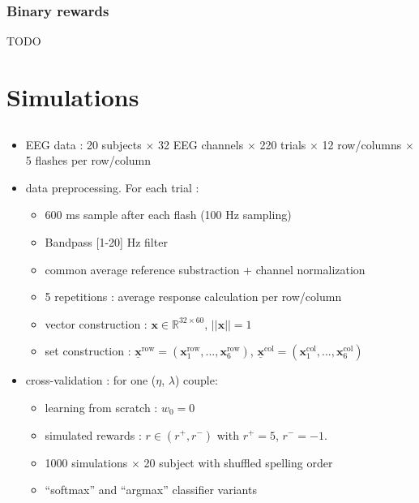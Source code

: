 \documentclass{beamer}
\begin{document}
\begin{frame}\frametitle{Binary rewards}
TODO
\end{frame}

\section{Simulations}
\subsection*{}

\begin{frame}
 \begin{itemize}
  \item EEG data : 20 subjects $\times$ 32 EEG channels $\times$ 220 trials $\times$ 12 row/columns $\times$ 5 flashes per row/column 
  \item data preprocessing. For each trial :
  \begin{itemize}
   \item 600 ms sample after each flash (100 Hz sampling)
   \item Bandpass [1-20] Hz filter
   \item common average reference substraction + channel normalization 
   \item 5 repetitions : average response calculation per row/column 
   \item vector construction : $\boldsymbol{x} \in \mathbb{R}^{32 \times 60}$, $||\boldsymbol{x}||=1$
   \item set construction : $\underline{\mathbf{x}}^\text{row} = (\boldsymbol{x}_1^\text{row}, ..., \boldsymbol{x}_6^\text{row})$, 
   $\underline{\mathbf{x}}^\text{col} = (\boldsymbol{x}_1^\text{col}, ..., \boldsymbol{x}_6^\text{col})$
  \end{itemize}
  \item cross-validation : for one ($\eta$, $\lambda$) couple:
  \begin{itemize}
    \item learning from scratch : $w_0 = 0$
    \item simulated rewards : $r \in (r^+, r^-)$ with $r^+ = 5$, $r^- = -1$.
    \item 1000 simulations $\times$ 20 subject with shuffled spelling order
    \item ``softmax'' and ``argmax'' classifier variants
  \end{itemize}
 \end{itemize}
\end{frame}
\end{document}
